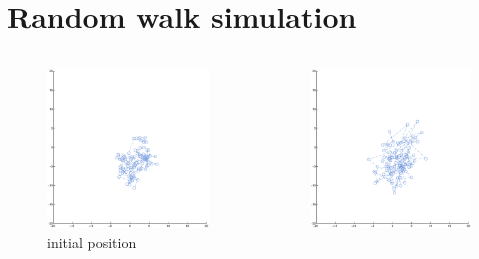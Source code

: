 \documentclass {beamer}
\begin{document}
\section{Random walk simulation}
\begin{frame}
\begin{columns}
		\begin{column}{0.5\textwidth}
		\begin{figure}
		\includegraphics[width=1.0\textwidth]{1.eps}
		\caption{initial position}
		\end{figure}		
		\end{column}
		\begin{column}{0.3\textwidth}
			\begin{figure}
		\includegraphics[width=1.5\textwidth]{2.eps}

\end{figure}
\end{column}
\end{columns}
\end{frame}
\end{document}
